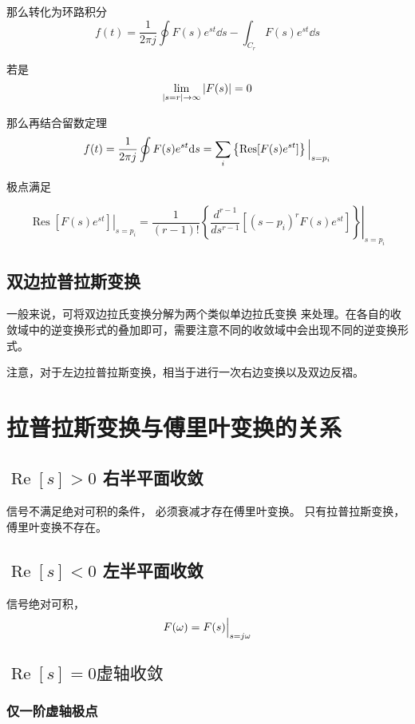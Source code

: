 \documentclass[cn,11pt,chinese,black,simple]{../elegantbook}
\begin{document}
那么转化为环路积分 
\[f(t) = \dfrac{1}{2 \pi j} \oint F(s) e^{st} \dd{s} - \int_{C_r}F(s)e^{st} \dd{s}\]

若是 \[\lim_{\left| s = r \right| \rightarrow \infty} \left| F(s) \right| = 0\]

那么再结合留数定理 \[f(t) = \dfrac{1}{2 \pi j} \oint F(s) e^{st} \mathrm{d}s =\displaystyle\sum_{i} \left\{\mathrm{Res}[F(s)e^{st}]\right\}\Big|_{s = p_i}\]

极点满足 

\[\left.\operatorname{Res}\left[F(s) e^{s t}\right]\right|_{s=p_{i}}=\left.\dfrac{1}{(r-1) !}\left\{\dfrac{ d ^{r-1}}{ d s^{r-1}}\left[\left(s-p_{i}\right)^{r} F(s) e^{s t}\right]\right\}\right|_{s=p_{i}}\]


\subsection{双边拉普拉斯变换}

一般来说，可将双边拉氏变换分解为两个类似单边拉氏变换
来处理。在各自的收敛域中的逆变换形式的叠加即可，需要注意不同的收敛域中会出现不同的逆变换形式。

注意，对于左边拉普拉斯变换，相当于进行一次右边变换以及双边反褶。

\section{拉普拉斯变换与傅里叶变换的关系}

\subsection{\(\operatorname{Re}[s] > 0\) 右半平面收敛}

信号不满足绝对可积的条件，
必须衰减才存在傅里叶变换。 只有拉普拉斯变换，傅里叶变换不存在。

\subsection{\(\operatorname{Re}[s] < 0\) 左半平面收敛}

信号绝对可积，\[F(\omega) = F(s)\Big|_{s = j \omega} \]

\subsection{\(\operatorname{Re}[s] = 0 虚轴收敛\)}

\subsubsection{仅一阶虚轴极点}
\end{document}
